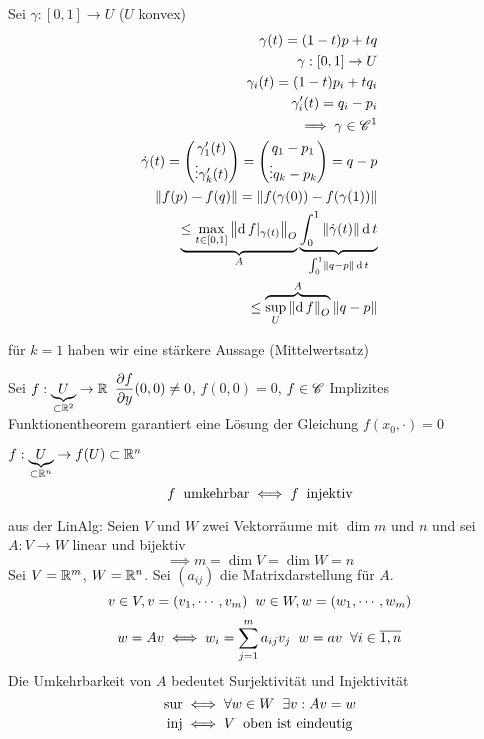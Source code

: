 \begin{Bew}
  Sei $\gamma:[0,1]\to U$ ($U$ konvex)
  \begin{eqnarray*}
    \gamma(t)=(1-t)p+tq\\
    \gamma:[0,1]\rightarrow U\\
    \gamma_i(t)=(1-t)p_i+tq_i\\
    \gamma_i'(t)=q_i-p_i\\
    \implies \gamma\in\mathscr{C}^1\\
    \dot\gamma(t)= \begin{pmatrix}
      \gamma_1'(t)\\ \vdots \gamma_k'(t)
    \end{pmatrix} = \begin{pmatrix}
      q_1-p_1 \\ \vdots q_k-p_k
    \end{pmatrix} = q-p \\
    \left\| f(p)-f(q) \right\|=\left\| f(\gamma(0))-f(\gamma(1)) \right\|\\
    \underbrace{\leq \max_{t\in [0,1]}\left\| \operatorname{d} f|_{\gamma(t)} \right\|_O}_A \underbrace{\int_0^1\left\| \dot\gamma(t) \right\|\operatorname{d} t}_{\int_0^1\left\| q-p \right\|\operatorname{d} t}\\
    \leq \overbrace{\sup_U\left\| \operatorname{d} f \right\|_O}^A\left\| q-p \right\|
  \end{eqnarray*}
\end{Bew}
\begin{Bem}
  für $k=1$ haben wir eine stärkere Aussage (Mittelwertsatz)
\end{Bem}
\begin{Bsp}
  Sei $f:\underbrace{U}_{\subset\mathbb{R}^2}\rightarrow\mathbb{R}$ $\dfrac{\partial f}{\partial y}(0,0)\neq 0$, $f(0,0)=0$, $f\in\mathscr{C}$ Implizites Funktionentheorem garantiert eine Lösung der Gleichung $f(x_0,\cdot) = 0$
\end{Bsp}
\begin{Bem}
  $f:\underbrace{U}_{\subset\mathbb{R}^n}\rightarrow f(U)\subset\mathbb{R}^n$
  \[f\hspace{2mm}\text{umkehrbar}\iff f\hspace{2mm}\text{injektiv}\]
\end{Bem}
\begin{Bem}
  aus der LinAlg: Seien $V$ und $W$ zwei Vektorräume mit $\dim m$ und $n$ und sei $A:V\to W$ linear und bijektiv
  \[\implies m=\dim V=\dim W=n\]
  Sei $V=\mathbb{R}^m$, $W=\mathbb{R}^n$. Sei $(a_{ij})$ die Matrixdarstellung für $A$.
  \[v\in V, v=(v_1,\cdots, v_m)\hspace{2mm} w\in W, w=(w_1,\cdots, w_m)\]
  \[w=Av\iff w_i=\sum_{j=1}^ma_{ij}v_j\hspace{2mm} w=av\hspace{2mm} \forall i\in \overline{1,n}\]
  Die Umkehrbarkeit von $A$ bedeutet Surjektivität und Injektivität
  \[\text{sur}\iff \forall w\in W\hspace{2mm}\exists v: Av=w\]
  \[\text{inj}\iff V\hspace{2mm}\text{oben ist eindeutig}\]
\end{Bem}
